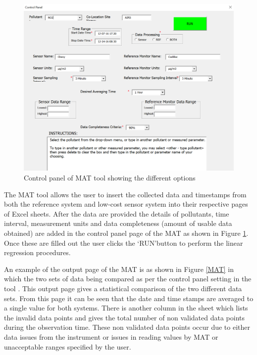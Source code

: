\begin{figure}[h!]
  \begin{center}
  \includegraphics[scale=0.55]{./images/figure43.png}
  \end{center}
  \caption{Control panel of MAT tool showing the different options \cite{National2017}}
  \label{controlpanel}
  \hspace{1 cm}
\end{figure}

The MAT tool allows the user to insert the collected data and timestamps from both the reference system and low-cost sensor system into their respective pages of Excel sheets.
After the data are provided the details of pollutants, time interval, measurement units and data completeness (amount of usable data obtained) are added in the control panel page of the MAT as shown in Figure \ref{controlpanel}. Once these are filled out the user clicks the \lq{RUN}\rq button to perform the linear regression procedures.





An example of the output page of the MAT is as shown in Figure \ref{MAT} in which the two sets of data being compared as per the control panel setting in the tool \cite{National2017}.
This output page gives a statistical comparison of the two different data sets. From this page it can be seen that the date and time stamps are averaged to a single value for both systems. There is another column in the sheet which lists the invalid data points and gives the total number of non validated data points during the observation time. These non validated data points occur due to either data issues from the instrument or issues in reading values by MAT or unacceptable ranges specified by the user.


